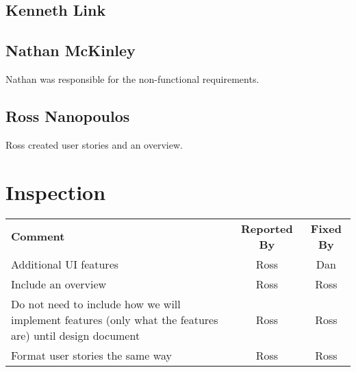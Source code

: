 \documentclass[letter]{scrartcl}
\begin{document}
\subsection{Kenneth Link}
\subsection{Nathan McKinley}
Nathan was responsible for the non-functional requirements.
\subsection{Ross Nanopoulos}
Ross created user stories and an overview.

\section{Inspection}
\begin{tabularx}{\textwidth}{X c c}
\textbf{Comment} & \textbf{Reported By} & \textbf{Fixed By} \\
Additional UI features & Ross & Dan \\
Include an overview & Ross & Ross \\
Do not need to include how we will implement features (only what the features are) until design document & Ross & Ross \\
Format user stories the same way & Ross & Ross \\
\end{tabularx}
\end{document}

